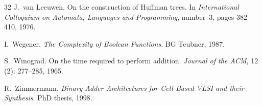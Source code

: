 \begin{thebibliography}{32}
J.~van Leeuwen.
\newblock On the construction of {Huffman} trees.
\newblock In \emph{International Colloquium on Automata, Languages and
  Programming}, number~3, pages 382--410, 1976.

I.~Wegener.
\newblock \emph{The Complexity of Boolean Functions}.
\newblock BG Teubner, 1987.

S.~Winograd.
\newblock On the time required to perform addition.
\newblock \emph{Journal of the ACM}, 12 (2): 277--285, 1965.

R.~Zimmermann.
\newblock \emph{Binary Adder Architectures for Cell-Based VLSI and their
  Synthesis}.
\newblock PhD thesis, 1998.

\end{thebibliography}

